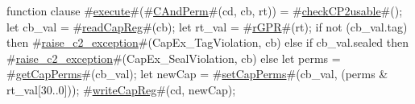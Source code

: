 function clause #\hyperref[zexecute]{execute}#(#\hyperref[zCAndPerm]{CAndPerm}#(cd, cb, rt)) = 
{
  #\hyperref[zcheckCP2usable]{checkCP2usable}#();
  let cb_val = #\hyperref[zreadCapReg]{readCapReg}#(cb);
  let rt_val = #\hyperref[zrGPR]{rGPR}#(rt);
  if not (cb_val.tag) then
    #\hyperref[zraisezyc2zyexception]{raise\_c2\_exception}#(CapEx_TagViolation, cb)
  else if cb_val.sealed then
    #\hyperref[zraisezyc2zyexception]{raise\_c2\_exception}#(CapEx_SealViolation, cb)
  else
  {
    let perms   = #\hyperref[zgetCapPerms]{getCapPerms}#(cb_val);
    let newCap  = #\hyperref[zsetCapPerms]{setCapPerms}#(cb_val, (perms & rt_val[30..0]));
    #\hyperref[zwriteCapReg]{writeCapReg}#(cd, newCap);
  }
}
